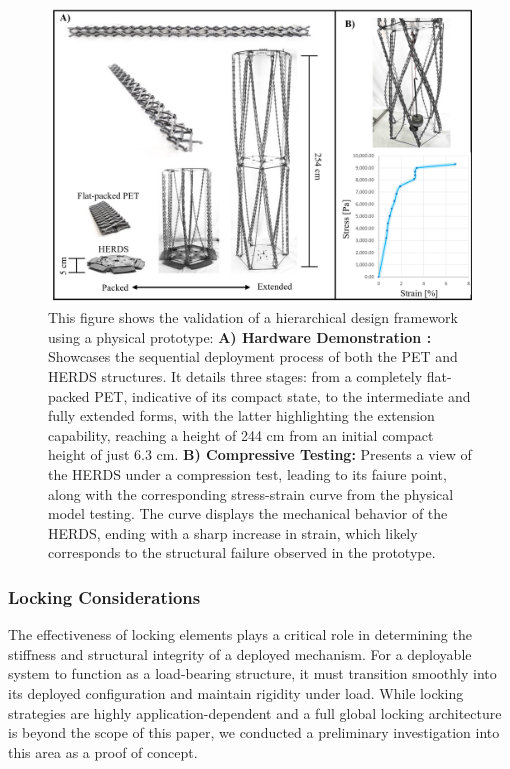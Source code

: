 \begin{figure}[ht]
    \centering
    \includegraphics[width=\linewidth]{Figures/fig5 - herd test.png} 
    \centering
    \caption{This figure shows the validation of a hierarchical design framework using a physical prototype: \textbf{A) Hardware Demonstration :} Showcases the sequential deployment process of both the PET and HERDS structures. It details three stages: from a completely flat-packed PET, indicative of its compact state, to the intermediate and fully extended forms, with the latter highlighting the extension capability, reaching a height of 244 cm from an initial compact height of just 6.3 cm. \textbf{B) Compressive Testing:} Presents a view of the HERDS under a compression test, leading to its faiure point, along with the corresponding stress-strain curve from the physical model testing. The curve displays the mechanical behavior of the HERDS, ending with a sharp increase in strain, which likely corresponds to the structural failure observed in the prototype.}\label{fig:large-HERDS}
\end{figure}

\subsubsection{Locking Considerations}
{The effectiveness of locking elements plays a critical role in determining the stiffness and structural integrity of a deployed mechanism. For a deployable system to function as a load-bearing structure, it must transition smoothly into its deployed configuration and maintain rigidity under load. While locking strategies are highly application-dependent and a full global locking architecture is beyond the scope of this paper, we conducted a preliminary investigation into this area as a proof of concept.}


